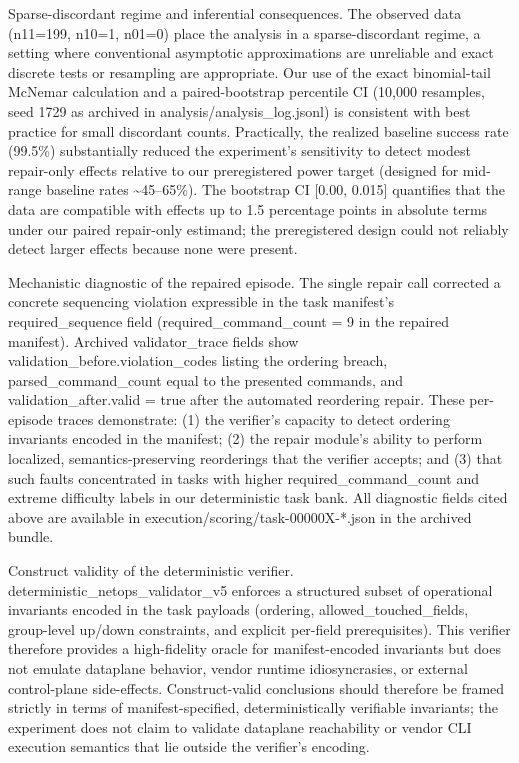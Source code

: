 \documentclass[conference]{IEEEtran}
\begin{document}
Sparse-discordant regime and inferential consequences. The observed data (n11=199, n10=1, n01=0) place the analysis in a sparse-discordant regime, a setting where conventional asymptotic approximations are unreliable and exact discrete tests or resampling are appropriate. Our use of the exact binomial-tail McNemar calculation and a paired-bootstrap percentile CI (10,000 resamples, seed 1729 as archived in analysis/analysis\_log.jsonl) is consistent with best practice for small discordant counts. Practically, the realized baseline success rate (99.5\%) substantially reduced the experiment's sensitivity to detect modest repair-only effects relative to our preregistered power target (designed for mid-range baseline rates \textasciitilde{}45--65\%). The bootstrap CI [0.00, 0.015] quantifies that the data are compatible with effects up to 1.5 percentage points in absolute terms under our paired repair-only estimand; the preregistered design could not reliably detect larger effects because none were present.

Mechanistic diagnostic of the repaired episode. The single repair call corrected a concrete sequencing violation expressible in the task manifest's required\_sequence field (required\_command\_count = 9 in the repaired manifest). Archived validator\_trace fields show validation\_before.violation\_codes listing the ordering breach, parsed\_command\_count equal to the presented commands, and validation\_after.valid = true after the automated reordering repair. These per-episode traces demonstrate: (1) the verifier's capacity to detect ordering invariants encoded in the manifest; (2) the repair module's ability to perform localized, semantics-preserving reorderings that the verifier accepts; and (3) that such faults concentrated in tasks with higher required\_command\_count and extreme difficulty labels in our deterministic task bank. All diagnostic fields cited above are available in execution/scoring/task-00000X-*.json in the archived bundle.

Construct validity of the deterministic verifier. deterministic\_netops\_validator\_v5 enforces a structured subset of operational invariants encoded in the task payloads (ordering, allowed\_touched\_fields, group-level up/down constraints, and explicit per-field prerequisites). This verifier therefore provides a high-fidelity oracle for manifest-encoded invariants but does not emulate dataplane behavior, vendor runtime idiosyncrasies, or external control-plane side-effects. Construct-valid conclusions should therefore be framed strictly in terms of manifest-specified, deterministically verifiable invariants; the experiment does not claim to validate dataplane reachability or vendor CLI execution semantics that lie outside the verifier's encoding.
\end{document}
